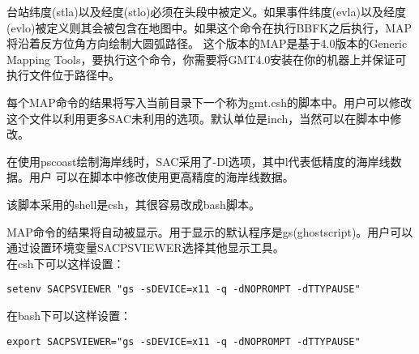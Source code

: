 台站纬度(stla)以及经度(stlo)必须在头段中被定义。如果事件纬度(evla)以及经度(evlo)被定义则其会被包含在地图中。如果这个命令在执行BBFK之后执行，MAP将沿着反方位角方向绘制大圆弧路径。
这个版本的MAP是基于4.0版本的Generic Mapping Tools，要执行这个命令，你需要将GMT4.0安装在你的机器上并保证可执行文件位于路径中。

每个MAP命令的结果将写入当前目录下一个称为gmt.csh的脚本中。用户可以修改这个文件以利用更多SAC未利用的选项。默认单位是inch，当然可以在脚本中修改。

在使用pscoast绘制海岸线时，SAC采用了-Dl选项，其中l代表低精度的海岸线数据。用户
可以在脚本中修改使用更高精度的海岸线数据。

该脚本采用的shell是csh，其很容易改成bash脚本。

MAP命令的结果将自动被显示。用于显示的默认程序是gs(ghostscript)。用户可以通过设置环境变量SACPSVIEWER选择其他显示工具。\\
在csh下可以这样设置：
\begin{verbatim}
setenv SACPSVIEWER "gs -sDEVICE=x11 -q -dNOPROMPT -dTTYPAUSE"
\end{verbatim}

在bash下可以这样设置：
\begin{verbatim}
export SACPSVIEWER="gs -sDEVICE=x11 -q -dNOPROMPT -dTTYPAUSE"
\end{verbatim}
